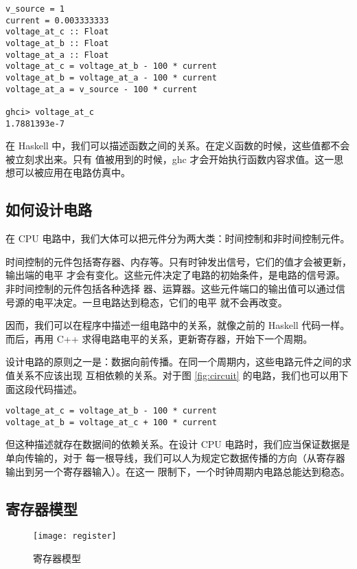 \documentclass[12pt]{article}
\begin{document}
    \begin{verbatim}
v_source = 1
current = 0.003333333
voltage_at_c :: Float
voltage_at_b :: Float
voltage_at_a :: Float
voltage_at_c = voltage_at_b - 100 * current
voltage_at_b = voltage_at_a - 100 * current
voltage_at_a = v_source - 100 * current

ghci> voltage_at_c
1.7881393e-7
    \end{verbatim}

    在 Haskell 中，我们可以描述函数之间的关系。在定义函数的时候，这些值都不会被立刻求出来。只有
    值被用到的时候，ghc 才会开始执行函数内容求值。这一思想可以被应用在电路仿真中。

    \subsection{如何设计电路}\label{feed_forward_evaluation}

    在 CPU 电路中，我们大体可以把元件分为两大类：时间控制和非时间控制元件。

    时间控制的元件包括寄存器、内存等。只有时钟发出信号，它们的值才会被更新，输出端的电平
    才会有变化。这些元件决定了电路的初始条件，是电路的信号源。非时间控制的元件包括各种选择
    器、运算器。这些元件端口的输出值可以通过信号源的电平决定。一旦电路达到稳态，它们的电平
    就不会再改变。

    因而，我们可以在程序中描述一组电路中的关系，就像之前的 Haskell 代码一样。而后，再用
    C++ 求得电路电平的关系，更新寄存器，开始下一个周期。

    设计电路的原则之一是：数据向前传播。在同一个周期内，这些电路元件之间的求值关系不应该出现
    互相依赖的关系。对于图 \ref{fig:circuit} 的电路，我们也可以用下面这段代码描述。

    \begin{verbatim}
voltage_at_c = voltage_at_b - 100 * current
voltage_at_b = voltage_at_c + 100 * current
    \end{verbatim}

    但这种描述就存在数据间的依赖关系。在设计 CPU 电路时，我们应当保证数据是单向传输的，对于
    每一根导线，我们可以人为规定它数据传播的方向（从寄存器输出到另一个寄存器输入）。在这一
    限制下，一个时钟周期内电路总能达到稳态。

    \subsection{寄存器模型}\label{register_model}

    \begin{figure}[h]
        \centering
        \texttt{[image: register]}
        \caption{寄存器模型}
        \label{fig:register}
    \end{figure}
\end{document}
